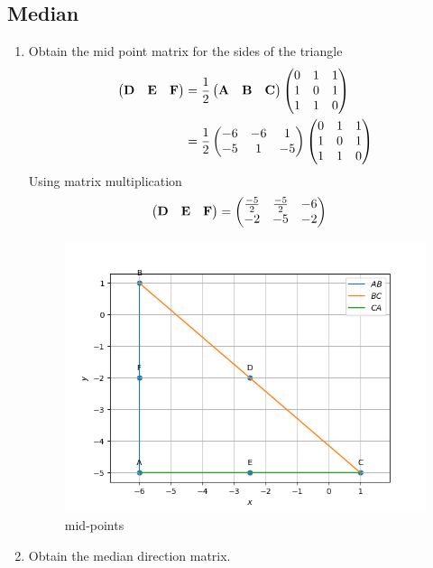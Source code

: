 \documentclass[11pt]{book}
\begin{document}
\subsection{Median}


\begin{enumerate}[label=\thesubsection.\arabic*.,ref=\thesubsection.\theenumi]
\item Obtain the mid point matrix for the sides of the triangle \\
\solution
\begin{align}
\begin{pmatrix}\mathbf{D} & \mathbf{E} &\mathbf{F}\end{pmatrix} &= \frac{1}{2}\begin{pmatrix}\mathbf{A} & \mathbf{B} &\mathbf{C}\end{pmatrix}
\begin{pmatrix}0 & 1 & 1 \\ 1 & 0 & 1 \\ 1 & 1 & 0\end{pmatrix} \\
&= \frac{1}{2}\begin{pmatrix}-6 & -6 & 1 \\ -5 & 1 & -5\end{pmatrix}\begin{pmatrix}0 & 1 & 1 \\ 1 & 0 & 1 \\ 1 & 1 & 0\end{pmatrix}
\end{align}
Using matrix multiplication 
\begin{align}
    \begin{pmatrix}\mathbf{D} & \mathbf{E} &\mathbf{F}\end{pmatrix} &= \begin{pmatrix}\frac{-5}{2} & \frac{-5}{2} & -6 \\ -2 & -5 & -2\end{pmatrix}
\end{align}
\begin{figure}[H]
    \centering
    \includegraphics{figs/Tri_mid.png}
    \caption{mid-points}
    \label{fig:mat_med1}
\end{figure}
\item Obtain the median direction matrix. \\

\end{enumerate}
\end{document}
